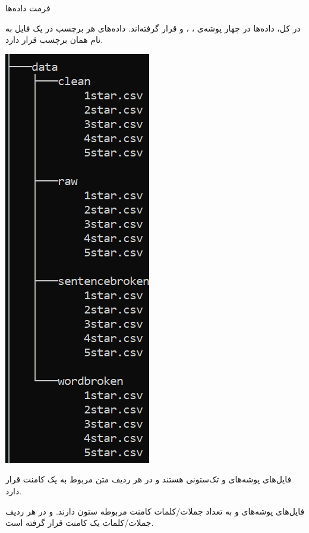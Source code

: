 \Section
{فرمت داده‌ها}
{
در کل، داده‌ها در چهار پوشه‌ی 
،
،
و
قرار گرفته‌اند. داده‌های هر برچسب در یک فایل  به نام همان برچسب قرار دارد.
\begin{center}
\includegraphics[scale = 0.75]{Images/data_folder_structure.PNG}
\end{center}
فایل‌های پوشه‌های 
 و 
تک‌ستونی هستند و در هر ردیف متن مربوط به یک کامنت قرار دارد.

فایل‌های پوشه‌های  و 
به تعداد جملات/کلمات کامنت مربوطه ستون دارند. و در هر ردیف جملات/کلمات یک کامنت قرار گرفته‌ است.
}